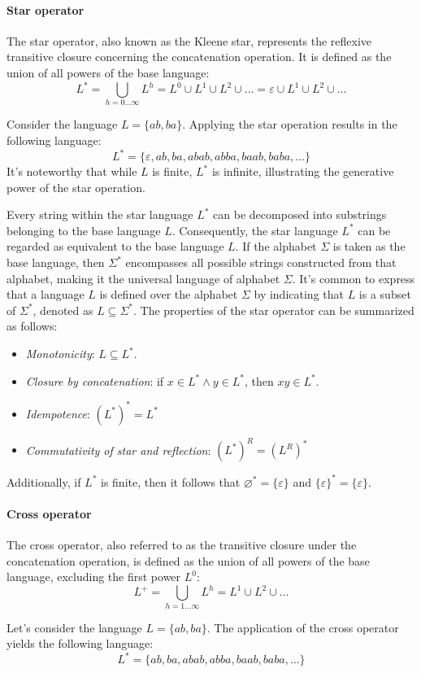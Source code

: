 \paragraph*{Star operator} 
The star operator, also known as the Kleene star, represents the reflexive transitive closure concerning the concatenation operation.
It is defined as the union of all powers of the base language:
\[L^{*}=\bigcup_{h=0\dots\infty}L^h=L^0 \cup L^1 \cup L^2 \cup \dots = \varepsilon \cup L^1 \cup L^2 \cup \dots\]
\begin{example}
    Consider the language $L=\{ab,ba\}$. 
    Applying the star operation results in the following language:
    \[L^{*}=\{\varepsilon, ab, ba, abab, abba, baab, baba, \dots\}\]
    It's noteworthy that while $L$ is finite, $L^{*}$ is infinite, illustrating the generative power of the star operation.
\end{example}
Every string within the star language $L^{*}$ can be decomposed into substrings belonging to the base language $L$.
Consequently, the star language $L^{*}$ can be regarded as equivalent to the base language $L$.
If the alphabet $\Sigma$ is taken as the base language, then $\Sigma^{*}$ encompasses all possible strings constructed from that alphabet, making it the universal language of alphabet $\Sigma$.
It's common to express that a language $L$ is defined over the alphabet $\Sigma$ by indicating that $L$ is a subset of $\Sigma^{*}$, denoted as $L \subseteq \Sigma^{*}$. 
The properties of the star operator can be summarized as follows:
\begin{itemize}
    \item \textit{Monotonicity}: $L \subseteq L^{*}$. 
    \item \textit{Closure by concatenation}: if $x \in L^{*} \land y \in L^{*}$, then $xy \in L^{*}$. 
    \item \textit{Idempotence}: $(L^{*})^{*}=L^{*}$
    \item \textit{Commutativity of star and reflection}: $(L^{*})^R=(L^R)^{*}$
\end{itemize}
Additionally, if $L^{*}$ is finite, then it follows that $\varnothing^{*}=\{\varepsilon\}$ and $\{\varepsilon\}^{*}=\{\varepsilon\}$. 

\paragraph*{Cross operator} 
The cross operator, also referred to as the transitive closure under the concatenation operation, is defined as the union of all powers of the base language, excluding the first power $L^0$:
\[L^{+}=\bigcup_{h=1\dots\infty}L^h=L^1 \cup L^2 \cup \dots\]
\begin{example}
    Let's consider the language $L=\{ab,ba\}$. 
    The application of the cross operator yields the following language:
    \[L^{*}=\{ab, ba, abab, abba, baab, baba, \dots\}\]
\end{example}

